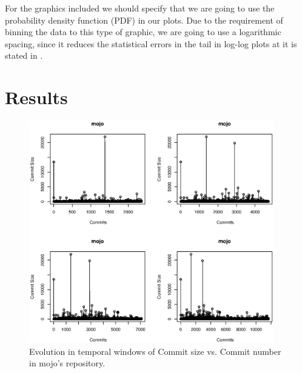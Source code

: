 \documentclass[conference]{IEEEtran}
\begin{document}
For the graphics included we should specify that we are going to use
the probability density function (PDF) in our plots. Due to the
requirement of binning the data to this type of graphic, we are going
to use a logarithmic spacing, since it reduces the statistical errors
in the tail in log-log plots at it is stated in
\cite{newman2005power}.





\section{Results}
\label{res}

\begin{figure}[htbp]
	\centerline{\includegraphics[width=0.95\textwidth]{img/mojo_temporal.eps}}
	\caption{Evolution in temporal windows of Commit size vs. Commit number in mojo's repository.}
	\label{fig:cask}
      \end{figure}
\end{document}
